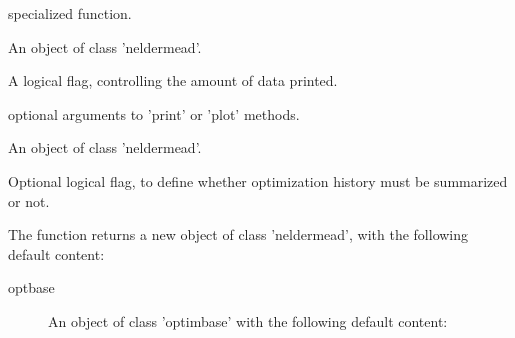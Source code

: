 \begin{Arguments}
\begin{ldescription}
specialized function.
\item[\code{x}] An object of class 'neldermead'.
\item[\code{verbose}] A logical flag, controlling the amount of data printed.
\item[\code{...}] optional arguments to 'print' or 'plot' methods.
\item[\code{object}] An object of class 'neldermead'.
\item[\code{showhistory}] Optional logical flag, to define whether optimization 
history must be summarized or not.
\end{ldescription}
\end{Arguments}
%
\begin{Value}
The  function returns a new object of class 'neldermead', 
with the following default content:\begin{description}

\item[optbase] An object of class 'optimbase' with the following default 
content: \begin{description}


\end{description}
\end{description}
\end{Value}
